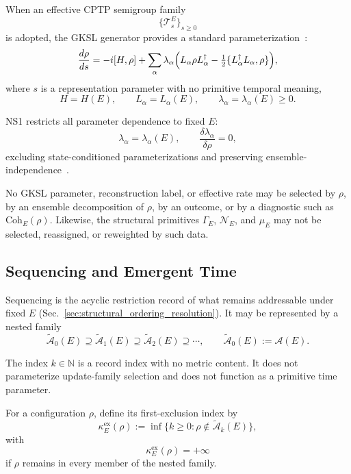 \documentclass[aps,prx,onecolumn,11pt]{revtex4-2}
\theoremstyle{plain}
\theoremstyle{definition}
\theoremstyle{remark}
\begin{document}
When an effective CPTP semigroup family
\[
\{\mathcal{T}^E_s\}_{s\geq 0}
\]
is adopted, the GKSL generator provides a standard
parameterization~\cite{Lindblad1976,Gorini1976,BreuerPetruccione2002,
RivasHuelgaPlenio2014,Watrous2018}:
\begin{equation}
\frac{d\rho}{ds}
=
-i[H,\rho]
+
\sum_\alpha
\lambda_\alpha
\Bigl(
L_\alpha\rho L_\alpha^\dagger
-
\tfrac{1}{2}
\{L_\alpha^\dagger L_\alpha,\rho\}
\Bigr),
\label{eq:cd_gksl_master}
\end{equation}
where \(s\) is a representation parameter with no primitive temporal
meaning,
\[
H=H(E),
\qquad
L_\alpha=L_\alpha(E),
\qquad
\lambda_\alpha=\lambda_\alpha(E)\geq 0.
\]

NS1 restricts all parameter dependence to fixed \(E\):
\begin{equation}
\lambda_\alpha=\lambda_\alpha(E),
\qquad
\frac{\delta\lambda_\alpha}{\delta\rho}=0,
\label{eq:cd_NS1_formal}
\end{equation}
excluding state-conditioned parameterizations and preserving
ensemble-independence~\cite{Gisin1989,Gisin1990,Polchinski1991,
Watrous2018}.

No GKSL parameter, reconstruction label, or effective rate may be
selected by \(\rho\), by an ensemble decomposition of \(\rho\), by an
outcome, or by a diagnostic such as \(\mathrm{Coh}_E(\rho)\). Likewise,
the structural primitives \(\Gamma_E\), \(\mathcal N_E\), and \(\mu_E\)
may not be selected, reassigned, or reweighted by such data.

\subsection{Sequencing and Emergent Time}
\label{subsec:cd_sequencing_emergent_time}

Sequencing is the acyclic restriction record of what remains addressable
under fixed \(E\)
(Sec.~\ref{sec:structural_ordering_resolution}). It may be represented
by a nested family
\[
\widetilde{\mathcal{A}}_0(E)
\supseteq
\widetilde{\mathcal{A}}_1(E)
\supseteq
\widetilde{\mathcal{A}}_2(E)
\supseteq
\cdots,
\qquad
\widetilde{\mathcal{A}}_0(E):=\mathcal A(E).
\]

The index \(k\in\mathbb N\) is a record index with no metric content. It
does not parameterize update-family selection and does not function as a
primitive time parameter.

For a configuration \(\rho\), define its first-exclusion index by
\begin{equation}
\kappa_E^{\mathrm{ex}}(\rho)
:=
\inf
\{
k\geq 0:
\rho\notin\widetilde{\mathcal A}_k(E)
\},
\label{eq:cd_first_exclusion_index}
\end{equation}
with
\[
\kappa_E^{\mathrm{ex}}(\rho)=+\infty
\]
if \(\rho\) remains in every member of the nested family.
\end{document}
